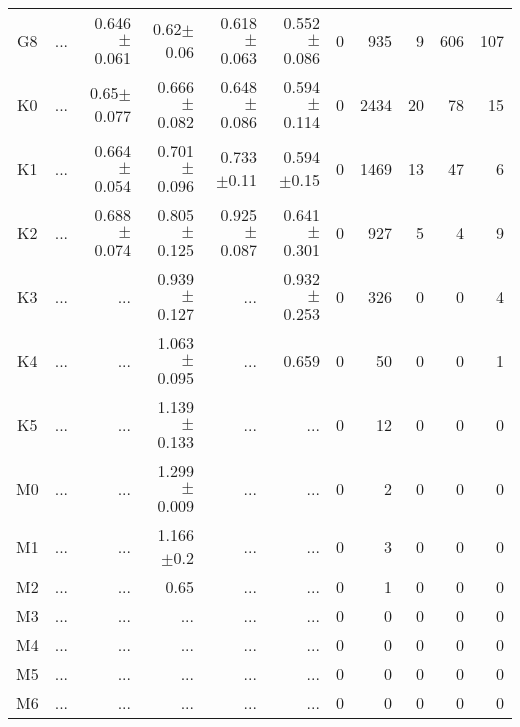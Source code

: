 \begin{table}[t]
\begin{center}
\begin{tabular}{c|rrrrr|rrrrr}
    G8	&	 ...	&	0.646$\pm$0.061	&	0.62$\pm$0.06	&	0.618$\pm$0.063	&	0.552$\pm$0.086	&	0	&	935	&	9	&	606	&	107	\\
    K0	&	 ...	&	0.65$\pm$0.077	&	0.666$\pm$0.082	&	0.648$\pm$0.086	&	0.594$\pm$0.114	&	0	&	2434	&	20	&	78	&	15	\\
    K1	&	 ...	&	0.664$\pm$0.054	&	0.701$\pm$0.096	&	0.733$\pm$0.11	&	0.594$\pm$0.15	&	0	&	1469	&	13	&	47	&	6	\\
    K2	&	 ...	&	0.688$\pm$0.074	&	0.805$\pm$0.125	&	0.925$\pm$0.087	&	0.641$\pm$0.301	&	0	&	927	&	5	&	4	&	9	\\
    K3	&	 ...	&	 ...	&	0.939$\pm$0.127	&	 ...	&	0.932$\pm$0.253	&	0	&	326	&	0	&	0	&	4	\\
    K4	&	 ...	&	 ...	&	1.063$\pm$0.095	&	 ...	&	0.659	&	0	&	50	&	0	&	0	&	1	\\
    K5	&	 ...	&	 ...	&	1.139$\pm$0.133	&	 ...	&	 ...	&	0	&	12	&	0	&	0	&	0	\\
    M0	&	 ...	&	 ...	&	1.299$\pm$0.009	&	 ...	&	 ...	&	0	&	2	&	0	&	0	&	0	\\
    M1	&	 ...	&	 ...	&	1.166$\pm$0.2	&	 ...	&	 ...	&	0	&	3	&	0	&	0	&	0	\\
    M2	&	 ...	&	 ...	&	0.65	&	 ...	&	 ...	&	0	&	1	&	0	&	0	&	0	\\
    M3	&	 ...	&	 ...	&	 ...	&	 ...	&	 ...	&	0	&	0	&	0	&	0	&	0	\\
    M4	&	 ...	&	 ...	&	 ...	&	 ...	&	 ...	&	0	&	0	&	0	&	0	&	0	\\
    M5	&	 ...	&	 ...	&	 ...	&	 ...	&	 ...	&	0	&	0	&	0	&	0	&	0	\\
    M6	&	 ...	&	 ...	&	 ...	&	 ...	&	 ...	&	0	&	0	&	0	&	0	&	0	\\
    \bottomrule
    \end{tabular}
\end{center}
\end{table}

